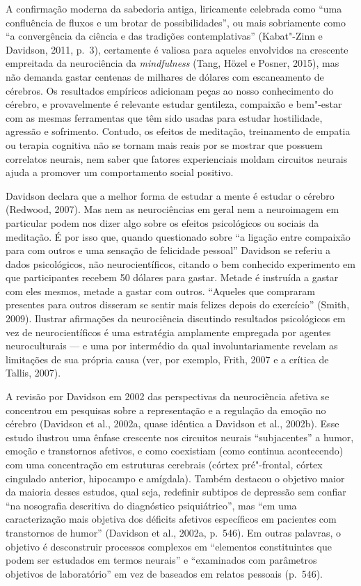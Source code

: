 A confirmação moderna da sabedoria antiga, liricamente celebrada como
``uma confluência de fluxos e um brotar de possibilidades'', ou mais
sobriamente como ``a convergência da ciência e das tradições
contemplativas'' (Kabat"-Zinn e Davidson, 2011, p.~3), certamente é
valiosa para aqueles envolvidos na crescente empreitada da neurociência
da \emph{mindfulness} (Tang, Hözel e Posner, 2015), mas não demanda
gastar centenas de milhares de dólares com escaneamento de cérebros. Os
resultados empíricos adicionam peças ao nosso conhecimento do cérebro, e
provavelmente é relevante estudar gentileza, compaixão e bem"-estar com
as mesmas ferramentas que têm sido usadas para estudar hostilidade,
agressão e sofrimento. Contudo, os efeitos de meditação, treinamento de
empatia ou terapia cognitiva não se tornam mais reais por se mostrar que
possuem correlatos neurais, nem saber que fatores experienciais moldam
circuitos neurais ajuda a promover um comportamento social positivo.

Davidson declara que a melhor forma de estudar a mente é estudar o
cérebro (Redwood, 2007). Mas nem as neurociências em geral nem a
neuroimagem em particular podem nos dizer algo sobre os efeitos
psicológicos ou sociais da meditação. É por isso que, quando questionado
sobre ``a ligação entre compaixão para com outros e uma sensação de
felicidade pessoal'' Davidson se referiu a dados psicológicos, não
neurocientíficos, citando o bem conhecido experimento em que
participantes recebem 50 dólares para gastar. Metade é instruída a
gastar com eles mesmos, metade a gastar com outros. ``Aqueles que
compraram presentes para outros disseram se sentir mais felizes depois
do exercício'' (Smith, 2009). Ilustrar afirmações da neurociência
discutindo resultados psicológicos em vez de neurocientíficos é uma
estratégia amplamente empregada por agentes neuroculturais --- e uma por
intermédio da qual involuntariamente revelam as limitações de sua
própria causa (ver, por exemplo, Frith, 2007 e a crítica de Tallis,
2007).

A revisão por Davidson em 2002 das perspectivas da neurociência afetiva
se concentrou em pesquisas sobre a representação e a regulação da emoção
no cérebro (Davidson et al., 2002a, quase idêntica a Davidson et al.,
2002b). Esse estudo ilustrou uma ênfase crescente nos circuitos neurais
``subjacentes'' a humor, emoção e transtornos afetivos, e como
coexistiam (como continua acontecendo) com uma concentração em
estruturas cerebrais (córtex pré"-frontal, córtex cingulado anterior,
hipocampo e amígdala). Também destacou o objetivo maior da maioria
desses estudos, qual seja, redefinir subtipos de depressão sem confiar
``na nosografia descritiva do diagnóstico psiquiátrico'', mas ``em uma
caracterização mais objetiva dos déficits afetivos específicos em
pacientes com transtornos de humor'' (Davidson et al., 2002a, p.~546). Em
outras palavras, o objetivo é desconstruir processos complexos em
``elementos constituintes que podem ser estudados em termos neurais'' e
``examinados com parâmetros objetivos de laboratório'' em vez de
baseados em relatos pessoais (p.~546).


